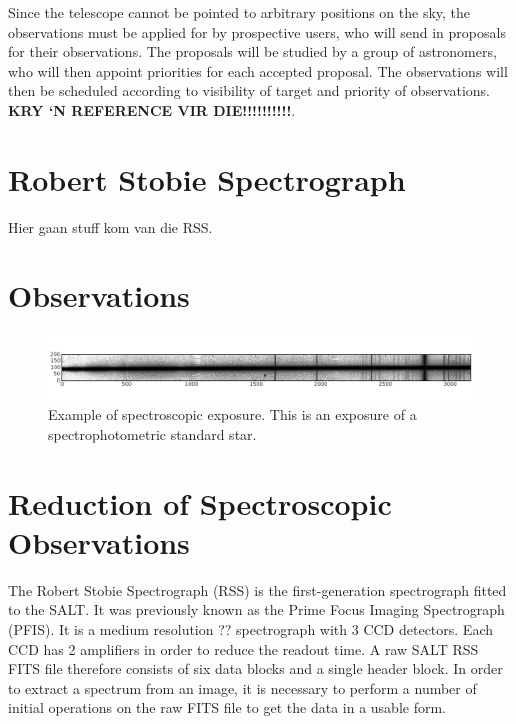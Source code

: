 Since the telescope cannot be pointed to arbitrary positions on the sky, the observations must be applied for by prospective users, who will send in proposals for their observations. The proposals will be studied by a group of astronomers, who will then appoint priorities for each accepted proposal. The observations will then be scheduled according to visibility of target and priority of observations. \textbf{KRY `N REFERENCE VIR DIE!!!!!!!!!!}.


\section{Robert Stobie Spectrograph}
\label{RSS}

Hier gaan stuff kom van die RSS.



\section{Observations}
\label{spec_obs}


\begin{figure}
\begin{center}
\includegraphics[width=\columnwidth,bb=0 0 600 100]{images/rss_example.png}
\caption[Example of spectroscopic exposure.]{Example of spectroscopic exposure. This is an exposure of a spectrophotometric standard star.}
\label{rss_example}
\end{center}
\end{figure}



\section{Reduction of Spectroscopic Observations}
\label{spec_reduce}

The Robert Stobie Spectrograph (RSS) is the first-generation spectrograph fitted to the SALT. It was previously known as the Prime Focus Imaging Spectrograph (PFIS). It is a medium resolution ?? spectrograph with 3 CCD detectors. Each CCD has 2 amplifiers in order to reduce the readout time. A raw SALT RSS FITS file therefore consists of six data blocks and a single header block. In order to extract a spectrum from an image, it is necessary to perform a number of initial operations on the raw FITS file to get the data in a usable form. 

